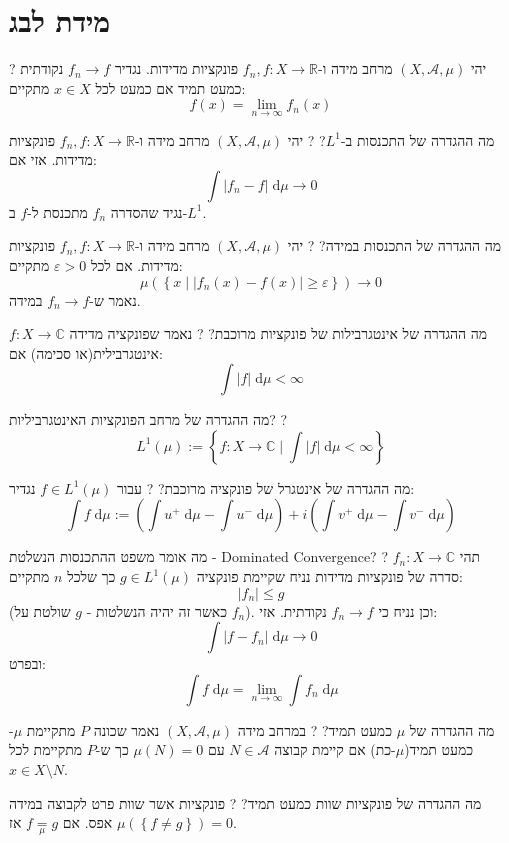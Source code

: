 \documentclass{tstextbook}
\begin{document}
\section{מידת לבג}

?
יהי \(\left( X,\mathcal{A},\mu \right)\) מרחב מידה ו-\(f_{n},f:X\to \mathbb{R}\) פונקציות מדידות. נגדיר \(f_{n}\to f\) נקודתית כמעט תמיד אם כמעט לכל \(x \in X\) מתקיים:
$$f(x)=\lim_{ n \to \infty } f_{n}(x)$$

מה ההגדרה של התכנסות ב-\(L^{1}\)?
?
יהי \(\left( X,\mathcal{A},\mu \right)\) מרחב מידה ו-\(f_{n},f :X\to \mathbb{R}\) פונקציות מדידות. אזי אם:
$$\int \lvert f_{n}-f \rvert  \;\mathrm{d} \mu\to 0 $$
נגיד שהסדרה \(f_{n}\) מתכנסת ל-\(f\) ב-\(L^{1}\).

מה ההגדרה של התכנסות במידה?
?
יהי \(\left( X,\mathcal{A},\mu \right)\) מרחב מידה ו-\(f_{n},f:X\to \mathbb{R}\) פונקציות מדידות. אם לכל \(\varepsilon> 0\) מתקיים:
$$\mu\left( \left\{  x\mid \lvert f_{n}(x)-f(x) \rvert \geq \varepsilon  \right\} \right)\to 0$$
נאמר ש-\(f_{n}\to f\) במידה.

מה ההגדרה של אינטגרבילות של פונקציות מרוכבת?
?
נאמר שפונקציה מדידה \(f:X\to \mathbb{C}\) אינטגרבילית(או סכימה) אם:
$$\int \lvert f \rvert  \;\mathrm{d} \mu < \infty $$

מה ההגדרה של מרחב הפונקציות האינטגרביליות?
?
$$L^{1}\left( \mu \right):= \left\{  f:X\to \mathbb{C} \mid \int  \lvert f \rvert  \;\mathrm{d} \mu < \infty   \right\}$$

מה ההגדרה של אינטגרל של פונקציה מרוכבת?
?
עבור \(f\in L^{1}\left( \mu \right)\) נגדיר:
$$\int f \;\mathrm{d} \mu := \left( \int u^{+} \;\mathrm{d} \mu -\int u^{-} \;\mathrm{d} \mu  \right)+ i\left( \int v^{+} \;\mathrm{d} \mu -\int v^{-} \;\mathrm{d} \mu  \right)$$

מה אומר משפט ההתכנסות הנשלטת - Dominated Convergence?
?
תהי \(f_{n}:X\to \mathbb{C}\) סדרה של פונקציות מדידות נניח שקיימת פונקציה \(g \in L^{1}\left( \mu \right)\) כך שלכל \(n\) מתקיים:
$$\lvert f_{n} \rvert \leq g$$
(כאשר זה יהיה הנשלטות - \(g\) שולטת על \(f_{n}\)). וכן נניח כי \(f_{n}\to f\) נקודתית. אזי:
$$\int \lvert f-f_{n} \rvert  \;\mathrm{d} \mu \xrightarrow{} 0 $$
ובפרט:
$$\int f \;\mathrm{d} \mu = \lim_{ n \to \infty } \int f_{n} \;\mathrm{d} \mu  $$

מה ההגדרה של \(\mu\) כמעט תמיד?
?
במרחב מידה \(\left( X,\mathcal{A},\mu \right)\) נאמר שכונה \(P\) מתקיימת \(\mu\)-כמעט תמיד(\(\mu\)-כת) אם קיימת קבוצה \(N \in \mathcal{A}\) עם \(\mu(N)=0\) כך ש-\(P\) מתקיימת לכל \(x \in X\setminus N\).

מה ההגדרה של פונקציות שוות כמעט תמיד?
?
פונקציות אשר שוות פרט לקבוצה במידה אפס. אם \(f \underset{\mu}{=} g\) אז \(\mu\left( \left\{  f\neq g  \right\} \right)=0\).
\end{document}
